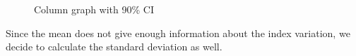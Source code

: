 \begin{figure}[h!]
    \centering
    \qquad
    \caption{Column graph with 90\% CI}
    \label{fig:200-90CI}
\end{figure}



Since the mean does not give enough information about the index variation, we decide to calculate the standard deviation as well.


